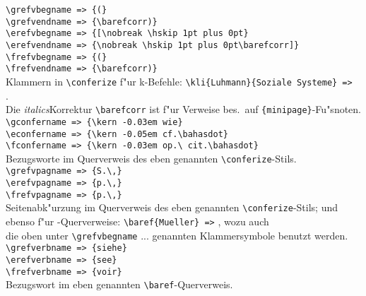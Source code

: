 \documentclass[12pt,a4paper]{article}
\begin{document}
{\newpage\noindent%
\verb|\grefvbegname => {(}| \\[-.8ex]
\hspace*{1cm} \verb|\grefvendname => {\barefcorr)}| \\[-.8ex]
\verb|\erefvbegname => {[\nobreak \hskip 1pt plus 0pt}| \\[-.8ex]
\hspace*{1cm} \verb|\erefvendname => {\nobreak \hskip 1pt plus 0pt\barefcorr]}| \\[-.8ex]
\verb|\frefvbegname => {(}| \\[-.8ex]
\hspace*{1cm} \verb|\frefvendname => {\barefcorr)}| \\[-.2ex]
Klammern in \verb|\conferize| f"ur k-Befehle: \verb|\kli{Luhmann}{Soziale Systeme} =>| \\[-.5ex]
{\conferize {}}. \\[-.5ex]
Die \textit{italics}\hy Korrektur \verb|\barefcorr| ist f"ur Verweise bes.\ auf \verb|{minipage}|-Fu"snoten.
\\[.8ex]%
\verb|\gconfername => {\kern -0.03em wie}| \\[-.8ex]
\verb|\econfername => {\kern -0.05em cf.\bahasdot}| \\[-.8ex]
\verb|\fconfername => {\kern -0.03em op.\ cit.\bahasdot}| \\[-.2ex]
Bezugsworte im Querverweis des eben genannten \verb|\conferize|-Stils.
\\[.8ex]%
\verb|\grefvpagname => {S.\,}| \\[-.8ex]
\verb|\erefvpagname => {p.\,}| \\[-.8ex]
\verb|\frefvpagname => {p.\,}| \\[-.2ex]
Seitenabk"urzung im Querverweis des eben genannten \verb|\conferize|-Stils; und \\[-.5ex]
ebenso f"ur \BibArts-Querverweise: \verb|\baref{Mueller} =>| , wozu auch \\[-.5ex]
die oben unter \verb|\grefvbegname| ... genannten Klammersymbole benutzt werden.
\\[.8ex]%
\verb|\grefverbname => {siehe}| \label{grefverbname} \\[-.8ex]
\verb|\erefverbname => {see}| \\[-.8ex]
\verb|\frefverbname => {voir}| \\[-.2ex]
Bezugswort im eben genannten \verb|\baref|-Querverweis.
\\[.8ex]%
}
\end{document}
